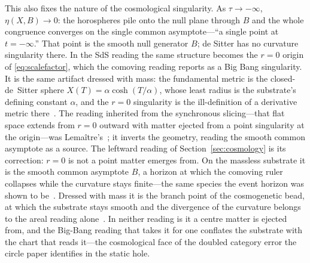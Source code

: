 \documentclass[11pt,a4paper]{article}
\theoremstyle{definition}
\begin{document}
This also fixes the nature of the cosmological singularity. As $\tau\to-\infty$, $\eta(X,B)\to0$: the horospheres pile onto the null plane through $B$ and the whole congruence converges on the single common asymptote---``a single point at $t=-\infty$.'' That point is the smooth null generator $B$; de Sitter has no curvature singularity there. In the SdS reading the same structure becomes the $r=0$ origin of \eqref{eq:scalefactor}, which the comoving reading reports as a Big Bang singularity. It is the same artifact dressed with mass: the fundamental metric is the closed-de~Sitter sphere $X(T)=\alpha\cosh(T/\alpha)$, whose least radius is the substrate's defining constant $\alpha$, and the $r=0$ singularity is the ill-definition of a derivative metric there~\cite{JanzenCRframework, Janzen2015}. The reading inherited from the synchronous slicing---that flat space extends from $r=0$ outward with matter ejected from a point singularity at the origin---was Lemaître's~\cite{Lemaitre1949}; it inverts the geometry, reading the smooth common asymptote as a source. The leftward reading of Section~\ref{sec:cosmology} is its correction: $r=0$ is not a point matter emerges from. On the massless substrate it is the smooth common asymptote $B$, a horizon at which the comoving ruler collapses while the curvature stays finite---the same species the event horizon was shown to be~\cite{JanzenBHcausality, JanzenCircle}. Dressed with mass it is the branch point of the cosmogenetic bead, at which the substrate stays smooth and the divergence of the curvature belongs to the areal reading alone~\cite{JanzenCRframework,JanzenCircle}. In neither reading is it a centre matter is ejected from, and the Big-Bang reading that takes it for one conflates the substrate with the chart that reads it---the cosmological face of the doubled category error the circle paper identifies in the static hole.
\end{document}

